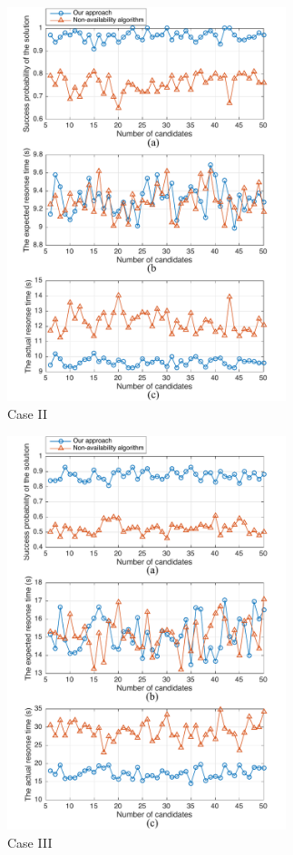 \documentclass[10pt,journal,compsoc]{IEEEtran}
\begin{document}
\begin{figure}[!t]
\centering
\includegraphics[width=3.2in]{./img/Task-12.pdf}
\caption{Case II}
\label{Task-12}
\end{figure}

\begin{figure}[!t]
\centering
\includegraphics[width=3.2in]{./img/Task-24.pdf}
\caption{Case III}
\label{Task-24}
\end{figure}
\end{document}
